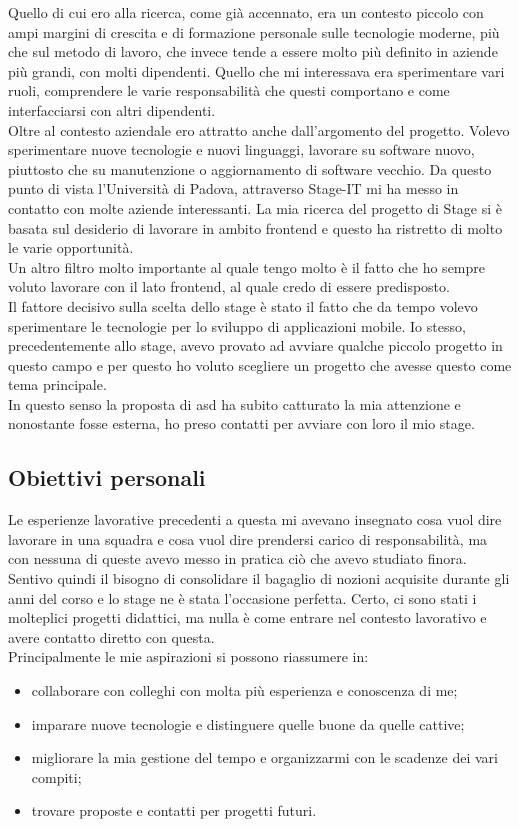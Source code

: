 Quello di cui ero alla ricerca, come già accennato, era un contesto piccolo con ampi margini di crescita e di formazione personale sulle tecnologie moderne, più che sul metodo di lavoro, che invece tende a essere molto più definito in aziende più grandi, con molti dipendenti. Quello che mi interessava era sperimentare vari ruoli, comprendere le varie responsabilità che questi comportano e come interfacciarsi con altri dipendenti. \\
Oltre al contesto aziendale ero attratto anche dall'argomento del progetto. Volevo sperimentare nuove tecnologie e nuovi linguaggi, lavorare su software nuovo, piuttosto che su manutenzione o aggiornamento di software vecchio. Da questo punto di vista l'Università di Padova, attraverso Stage-IT mi ha messo in contatto con molte aziende interessanti.
La mia ricerca del progetto di Stage si è basata sul desiderio di lavorare in ambito frontend e questo ha ristretto di molto le varie opportunità. \\
Un altro filtro molto importante al quale tengo molto è il fatto che ho sempre voluto lavorare con il lato \gls{frontend}, al quale credo di essere predisposto. \\
Il fattore decisivo sulla scelta dello stage è stato il fatto che da tempo volevo sperimentare le tecnologie per lo sviluppo di applicazioni mobile. Io stesso, precedentemente allo stage, avevo provato ad avviare qualche piccolo progetto in questo campo e per questo ho voluto scegliere un progetto che avesse questo come tema principale. \\
In questo senso la proposta di \acrlong{asd} ha subito catturato la mia attenzione e nonostante fosse esterna, ho preso contatti per avviare con loro il mio stage.

\subsection{Obiettivi personali}
Le esperienze lavorative precedenti a questa mi avevano insegnato cosa vuol dire lavorare in una squadra e cosa vuol dire prendersi carico di responsabilità, ma con nessuna di queste avevo messo in pratica ciò che avevo studiato finora. Sentivo quindi il bisogno di consolidare il bagaglio di nozioni acquisite durante gli anni del corso e lo stage ne è stata l'occasione perfetta. Certo, ci sono stati i molteplici progetti didattici, ma nulla è come entrare nel contesto lavorativo e avere contatto diretto con questa. \\
Principalmente le mie aspirazioni si possono riassumere in:
\begin{itemize}
	\item collaborare con colleghi con molta più esperienza e conoscenza di me;
	\item imparare nuove tecnologie e distinguere quelle buone da quelle cattive;
	\item migliorare la mia gestione del tempo e organizzarmi con le scadenze dei vari compiti;
	\item trovare proposte e contatti per progetti futuri.
\end{itemize}

